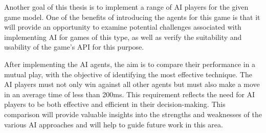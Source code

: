 Another goal of this thesis is to implement a range of AI players for the given game model. One of the benefits of introducing the agents for this game is that it will provide an opportunity to examine potential challenges associated with implementing AI for games of this type, as well as verify the suitability and usability of the game's API for this purpose.

After implementing the AI agents, the aim is to compare their performance in a mutual play, with the objective of identifying the most effective technique. The AI players must not only win against all other agents but must also make a move in an average time of less than 200ms. This requirement reflects the need for AI players to be both effective and efficient in their decision-making. This comparison will provide valuable insights into the strengths and weaknesses of the various AI approaches and will help to guide future work in this area. 
